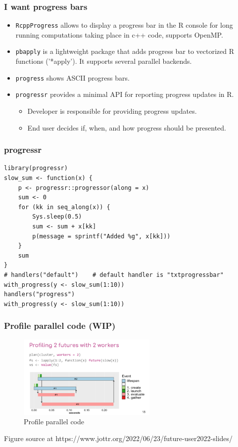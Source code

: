 \documentclass[aspectratio=169,xcolor={dvipsnames,table}]{beamer}
\begin{document}
\begin{frame}
  \frametitle{I want progress bars}
  \begin{itemize}
  \item \texttt{RcppProgress} allows to display a progress bar in the R console for long running computations taking place in c++ code, supports OpenMP.
  \item \texttt{pbapply} is a lightweight package that adds progress bar to vectorized R functions ('*apply'). It supports several parallel backends.
  \item \texttt{progress} shows ASCII progress bars. 
  \item \texttt{progressr} provides a minimal API for reporting progress updates in R.
    \begin{itemize}
    \item Developer is responsible for providing progress updates.
    \item End user decides if, when, and how progress should be presented. 
    \end{itemize}
  \end{itemize}
\end{frame}

\begin{frame}[fragile]
  \frametitle{progressr}
\begin{verbatim}
library(progressr)
slow_sum <- function(x) {
    p <- progressr::progressor(along = x)
    sum <- 0
    for (kk in seq_along(x)) {
        Sys.sleep(0.5)
        sum <- sum + x[kk]
        p(message = sprintf("Added %g", x[kk]))
    }
    sum
}
# handlers("default")    # default handler is "txtprogressbar"
with_progress(y <- slow_sum(1:10))
handlers("progress")
with_progress(y <- slow_sum(1:10))
\end{verbatim}
\end{frame}

\begin{frame}[fragile]
  \frametitle{Profile parallel code (WIP)}
  \begin{figure}[htbp]
    \centering
    \includegraphics[width = 0.6\textwidth]{profile_future}
    \caption{Profile parallel code}
  \end{figure}
  Figure source at https://www.jottr.org/2022/06/23/future-user2022-slides/
\end{frame}
\end{document}
